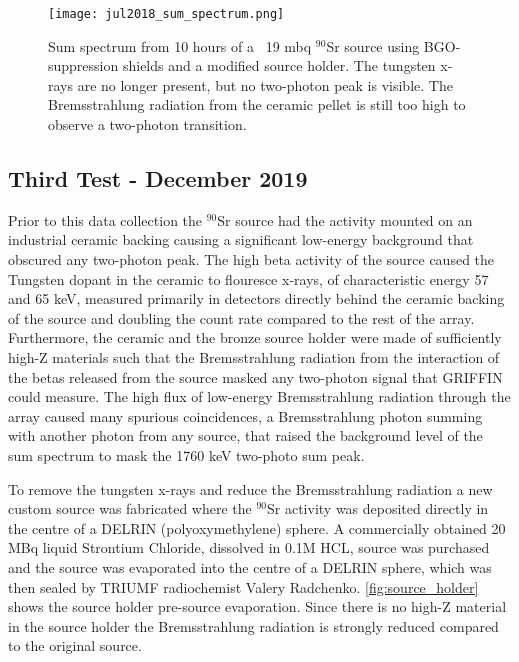 \documentclass[cnatzke_thesis_proposal.tex]{subfiles}
\begin{document}
\begin{figure}[htbp]
  \centering
  \texttt{[image: jul2018\_sum\_spectrum.png]}
  \caption{Sum spectrum from 10 hours of a ~19 mbq $^{90}$Sr source using BGO-suppression shields and a modified source holder. The tungsten x-rays are no longer present, but no two-photon peak is visible. The Bremsstrahlung radiation from the ceramic pellet is still too high to observe a two-photon transition.}
  \label{fig:sum_spectrum_jul2018}
\end{figure}

\subsection{Third Test - December 2019}

Prior to this data collection the $^{90}$Sr source had the activity mounted on an industrial ceramic backing causing a significant low-energy background that obscured any two-photon peak.
The high beta activity of the source caused the Tungsten dopant in the ceramic to flouresce x-rays, of characteristic energy 57 and 65 keV, measured primarily in detectors directly behind the ceramic backing of the source and doubling the count rate compared to the rest of the array. 
Furthermore, the ceramic and the bronze source holder were made of sufficiently high-Z materials such that the Bremsstrahlung radiation from the interaction of the betas released from the source masked any two-photon signal that GRIFFIN could measure.
The high flux of low-energy Bremsstrahlung radiation through the array caused many spurious coincidences, a Bremsstrahlung photon summing with another photon from any source, that raised the background level of the sum spectrum to mask the 1760 keV two-photo sum peak.

To remove the tungsten x-rays and reduce the Bremsstrahlung radiation a new custom source was fabricated where the $^{90}$Sr activity was deposited directly in the centre of a DELRIN (polyoxymethylene) sphere.
A commercially obtained 20 MBq liquid Strontium Chloride, dissolved in 0.1M HCL, source was purchased and the source was evaporated into the centre of a DELRIN sphere, which was then sealed by TRIUMF radiochemist Valery Radchenko.
\ref{fig:source_holder} shows the source holder pre-source evaporation.
Since there is no high-Z material in the source holder the Bremsstrahlung radiation is strongly reduced compared to the original source.
\end{document}

